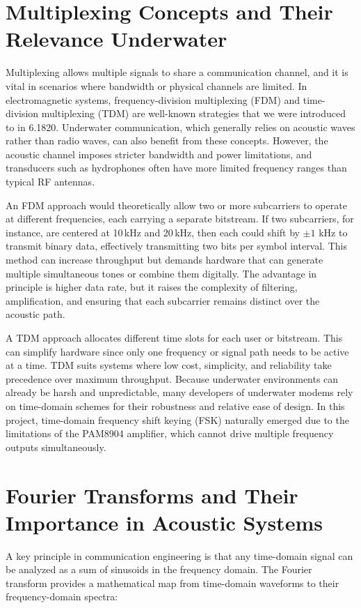 \section{Multiplexing Concepts and Their Relevance Underwater}

Multiplexing allows multiple signals to share a communication channel, and it is vital in scenarios where bandwidth or physical channels are limited. In electromagnetic systems, frequency-division multiplexing (FDM) and time-division multiplexing (TDM) are well-known strategies that we were introduced to in 6.1820. Underwater communication, which generally relies on acoustic waves rather than radio waves, can also benefit from these concepts. However, the acoustic channel imposes stricter bandwidth and power limitations, and transducers such as hydrophones often have more limited frequency ranges than typical RF antennas.

An FDM approach would theoretically allow two or more subcarriers to operate at different frequencies, each carrying a separate bitstream. If two subcarriers, for instance, are centered at 10\,kHz and 20\,kHz, then each could shift by \(\pm1\) kHz to transmit binary data, effectively transmitting two bits per symbol interval. This method can increase throughput but demands hardware that can generate multiple simultaneous tones or combine them digitally. The advantage in principle is higher data rate, but it raises the complexity of filtering, amplification, and ensuring that each subcarrier remains distinct over the acoustic path.

A TDM approach allocates different time slots for each user or bitstream. This can simplify hardware since only one frequency or signal path needs to be active at a time. TDM suits systems where low cost, simplicity, and reliability take precedence over maximum throughput. Because underwater environments can already be harsh and unpredictable, many developers of underwater modems rely on time-domain schemes for their robustness and relative ease of design. In this project, time-domain frequency shift keying (FSK) naturally emerged due to the limitations of the PAM8904 amplifier, which cannot drive multiple frequency outputs simultaneously.

\section{Fourier Transforms and Their Importance in Acoustic Systems}

A key principle in communication engineering is that any time-domain signal can be analyzed as a sum of sinusoids in the frequency domain. The Fourier transform provides a mathematical map from time-domain waveforms to their frequency-domain spectra:

